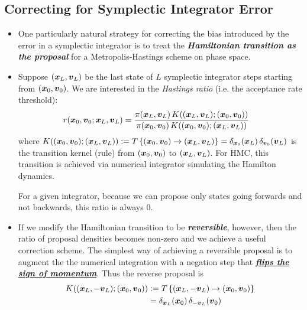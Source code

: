 \documentclass[11pt]{article}
\begin{document}
\subsection{Correcting for Symplectic Integrator Error}
\begin{itemize}
\item One particularly natural strategy for correcting the bias introduced by the error in a symplectic integrator is to treat the \emph{\textbf{Hamiltonian transition as the proposal}} for a Metropolis-Hastings scheme on phase space. 

\item Suppose $(\boldsymbol{x}_{L}, \boldsymbol{v}_{L})$ be the last state of $L$ symplectic integrator steps starting from $(\boldsymbol{x}_{0}, \boldsymbol{v}_{0})$. We are interested in the \emph{Hastings ratio} (i.e. the acceptance rate threshold):
\begin{align*}
r(\boldsymbol{x}_{0}, \boldsymbol{v}_{0}; \boldsymbol{x}_{L}, \boldsymbol{v}_{L}) &=\frac{\pi(\boldsymbol{x}_{L}, \boldsymbol{v}_{L})\,K((\boldsymbol{x}_{L}, \boldsymbol{v}_{L}); (\boldsymbol{x}_{0}, \boldsymbol{v}_{0}))}{\pi(\boldsymbol{x}_{0}, \boldsymbol{v}_{0})\,K((\boldsymbol{x}_{0}, \boldsymbol{v}_{0}); (\boldsymbol{x}_{L}, \boldsymbol{v}_{L}))} 
\end{align*} where $K((\boldsymbol{x}_{0}, \boldsymbol{v}_{0}); (\boldsymbol{x}_{L}, \boldsymbol{v}_{L})):= T\left\{(\boldsymbol{x}_{0}, \boldsymbol{v}_{0})\rightarrow (\boldsymbol{x}_{L}, \boldsymbol{v}_{L})\right\} = \delta_{\boldsymbol{x}_{0}}(\boldsymbol{x}_{L})\,\delta_{\boldsymbol{v}_{0}}(\boldsymbol{v}_{L})$ is the transition kernel (rule) from $(\boldsymbol{x}_{0}, \boldsymbol{v}_{0})$ to  $(\boldsymbol{x}_{L}, \boldsymbol{v}_{L})$. For HMC, this transition is achieved via numerical integrator simulating the Hamilton dynamics. 

For a given integrator, because we can propose only states going forwards and not backwards, this ratio is always $0$.

\item If we modify the Hamiltonian transition to be \emph{\textbf{reversible}}, however, then the ratio of proposal densities becomes non-zero and we achieve a useful correction scheme. The simplest way of achieving a reversible proposal is to augment the the numerical integration with a negation step that \underline{\emph{\textbf{flips the sign of momentum}}}. Thus the reverse proposal is 
\begin{align*}
K((\boldsymbol{x}_{L}, -\boldsymbol{v}_{L}); (\boldsymbol{x}_{0}, \boldsymbol{v}_{0})) &:= T\left\{(\boldsymbol{x}_{L}, -\boldsymbol{v}_{L})\rightarrow (\boldsymbol{x}_{0}, \boldsymbol{v}_{0})\right\}\\
&= \delta_{\boldsymbol{x}_{L}}(\boldsymbol{x}_{0})\,\delta_{-\boldsymbol{v}_{L}}(\boldsymbol{v}_{0})
\end{align*}



\end{itemize}
\end{document}
